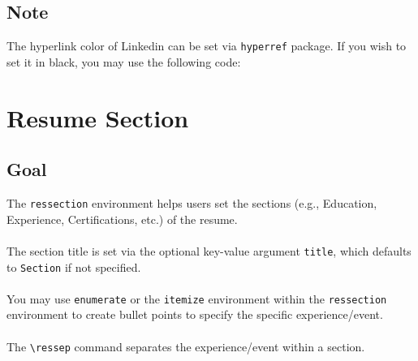 \documentclass[a4paper, 10pt]{article}
\begin{document}
\subsection{Note}
The hyperlink color of Linkedin can be set via {\tt hyperref} package. If you
wish to set it in black, you may use the following code:

\begin{codebox}[title = Color of Hyperlink]
    \usepackage[hidelinks]{hyperref}
\end{codebox}

\newpage

\section{Resume Section}

\subsection{Goal}
The \verb+ressection+ environment helps users set the sections (e.g., Education,
Experience, Certifications, etc.) of the resume.\\
~\\
The section title is set via the optional key-value argument \verb+title+,
which defaults to {\tt Section} if not specified.\\
~\\
You may use {\tt enumerate} or the {\tt itemize} environment within the
{\tt ressection} environment to create bullet points to specify the specific
experience/event.\\
~\\
The \verb+\ressep+ command separates the experience/event within a section.

\newpage
\end{document}

